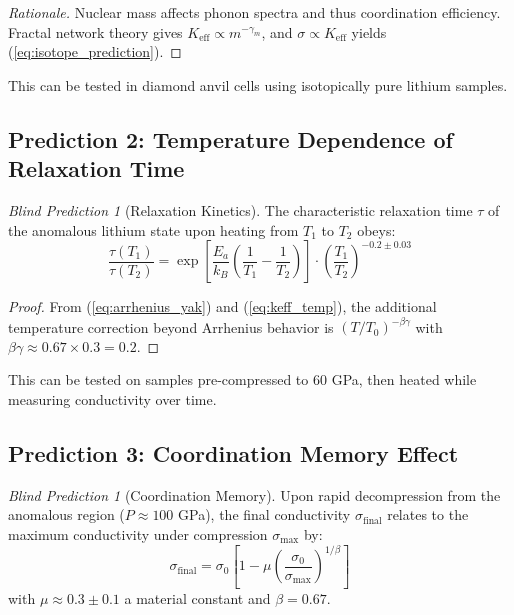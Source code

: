 \documentclass[12pt,a4paper]{article}
\theoremstyle{remark}
\newtheorem{prediction}[theorem]{Blind Prediction}
\newcommand{\Ke}{K_{\mathrm{eff}}}
\begin{document}
	\begin{proof}[Rationale]
		Nuclear mass affects phonon spectra and thus coordination efficiency. Fractal network theory gives \(\Ke \propto m^{-\gamma_m}\), and \(\sigma \propto \Ke\) yields (\ref{eq:isotope_prediction}).
	\end{proof}
	
	This can be tested in diamond anvil cells using isotopically pure lithium samples.
	
	\subsection{Prediction 2: Temperature Dependence of Relaxation Time}
	
	\begin{prediction}[Relaxation Kinetics]
		The characteristic relaxation time \(\tau\) of the anomalous lithium state upon heating from \(T_1\) to \(T_2\) obeys:
		\begin{equation}
			\frac{\tau(T_1)}{\tau(T_2)} = \exp\left[ \frac{E_a}{k_B} \left( \frac{1}{T_1} - \frac{1}{T_2} \right) \right] \cdot \left( \frac{T_1}{T_2} \right)^{-0.2 \pm 0.03}
			\label{eq:relaxation_prediction}
		\end{equation}
		\label{pred:relaxation}
	\end{prediction}
	
	\begin{proof}
		From (\ref{eq:arrhenius_yak}) and (\ref{eq:keff_temp}), the additional temperature correction beyond Arrhenius behavior is \((T/T_0)^{-\beta\gamma}\) with \(\beta\gamma \approx 0.67 \times 0.3 = 0.2\).
	\end{proof}
	
	This can be tested on samples pre-compressed to 60 GPa, then heated while measuring conductivity over time.
	
	\subsection{Prediction 3: Coordination Memory Effect}
	
	\begin{prediction}[Coordination Memory]
		Upon rapid decompression from the anomalous region (\(P \approx 100\) GPa), the final conductivity \(\sigma_{\text{final}}\) relates to the maximum conductivity under compression \(\sigma_{\text{max}}\) by:
		\begin{equation}
			\sigma_{\text{final}} = \sigma_0 \left[1 - \mu \left( \frac{\sigma_0}{\sigma_{\text{max}}} \right)^{1/\beta} \right]
			\label{eq:memory_prediction}
		\end{equation}
		with \(\mu \approx 0.3 \pm 0.1\) a material constant and \(\beta = 0.67\).
		\label{pred:memory}
	\end{prediction}
	
\end{document}
